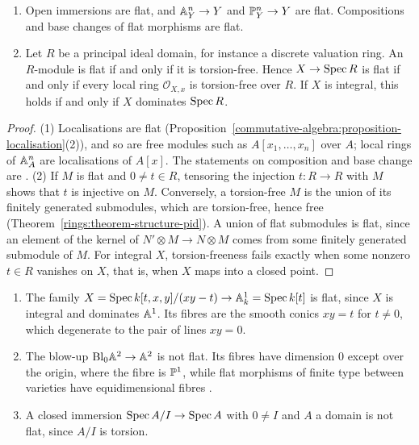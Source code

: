 \begin{proposition}\label{schemes:proposition-flat}
\begin{enumerate}
\item Open immersions are flat, and $\mathbb{A}^n_Y \to Y$ and $\mathbb{P}^n_Y \to Y$ are flat. Compositions and base changes of flat morphisms are flat.
\item Let $R$ be a principal ideal domain, for instance a discrete valuation ring. An $R$-module is flat if and only if it is torsion-free. Hence
$X \to \operatorname{Spec} R$ is flat if and only if every local ring $\mathcal{O}_{X,x}$ is torsion-free over $R$. If $X$ is integral, this holds if and only if
$X$ dominates $\operatorname{Spec} R$.
\end{enumerate}
\end{proposition}

\begin{proof}
(1) Localisations are flat (Proposition~\ref{commutative-algebra:proposition-localisation}(2)), and so are free modules such as $A[x_1, \ldots, x_n]$ over $A$;
local rings of $\mathbb{A}^n_A$ are localisations of $A[x]$. The statements on composition and base change are \cite[Proposition III.9.2]{hartshorne-ag}.
(2) If $M$ is flat and $0 \neq t \in R$, tensoring the injection $t \colon R \to R$ with $M$ shows that $t$ is injective on $M$. Conversely, a torsion-free
$M$ is the union of its finitely generated submodules, which are torsion-free, hence free (Theorem~\ref{rings:theorem-structure-pid}). A union of flat
submodules is flat, since an element of the kernel of $N' \otimes M \to N \otimes M$ comes from some finitely generated submodule of $M$. For integral $X$,
torsion-freeness fails exactly when some nonzero $t \in R$ vanishes on $X$, that is, when $X$ maps into a closed point.
\end{proof}

\begin{example}\label{schemes:example-flat}
\begin{enumerate}
\item The family $X = \operatorname{Spec} k[t, x, y]/(xy - t) \to \mathbb{A}^1_k = \operatorname{Spec} k[t]$ is flat, since $X$ is integral and dominates $\mathbb{A}^1$. Its fibres are the smooth conics
$xy = t$ for $t \neq 0$, which degenerate to the pair of lines $xy = 0$.
\item The blow-up $\mathrm{Bl}_0\mathbb{A}^2 \to \mathbb{A}^2$ is not flat. Its fibres have dimension $0$ except over the origin, where the fibre is $\mathbb{P}^1$, while flat morphisms
of finite type between varieties have equidimensional fibres \cite[Proposition III.9.5]{hartshorne-ag}.
\item A closed immersion $\operatorname{Spec} A/I \to \operatorname{Spec} A$ with $0 \neq I$ and $A$ a domain is not flat, since $A/I$ is torsion.
\end{enumerate}
\end{example}

